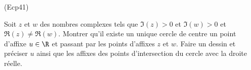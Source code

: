 \begin{tiny}(Ecp41)\end{tiny} \label{Ecp41} Soit $z$ et $w$ des nombres complexes tels que $\Im(z)>0$ et $\Im(w)>0$ et $\Re(z)\neq \Re(w)$.\newline
Montrer qu'il existe un unique cercle de centre un point d'affixe $u\in \R$ et passant par les points d'affixes $z$ et $w$. Faire un dessin et préciser $u$ ainsi que les affixes des points d'intersection du cercle avec la droite réelle. 